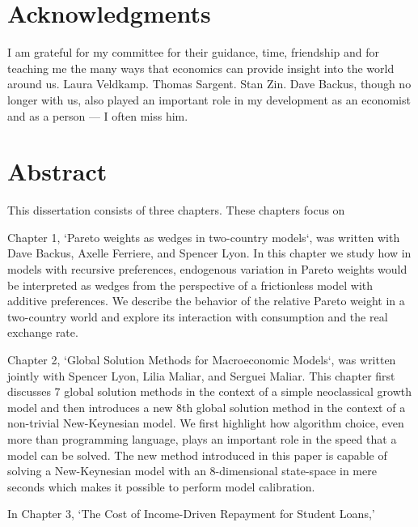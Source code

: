\documentclass[12pt,letterpaper,oneside,final]{memoir}
\begin{document}
\newpage

\chapter{Acknowledgments}

  I am grateful for my committee for their guidance, time, friendship and for teaching me the many
  ways that economics can provide insight into the world around us. Laura Veldkamp. Thomas Sargent.
  Stan Zin. Dave Backus, though no longer with us, also played an important role in my development
  as an economist and as a person --- I often miss him.

\newpage

\newpage

\chapter{Abstract}

  \DoubleSpacing

  This dissertation consists of three chapters. These chapters focus on

  Chapter 1, `Pareto weights as wedges in two-country models`, was written with Dave Backus, Axelle
  Ferriere, and Spencer Lyon. In this chapter we study how in models with recursive preferences,
  endogenous variation in Pareto weights would be interpreted as wedges from the perspective of a
  frictionless model with additive preferences. We describe the behavior of the relative Pareto
  weight in a two-country world and explore its interaction with consumption and the real exchange
  rate.

  Chapter 2, `Global Solution Methods for Macroeconomic Models`, was written jointly with Spencer
  Lyon, Lilia Maliar, and Serguei Maliar. This chapter first discusses 7 global solution methods in
  the context of a simple neoclassical growth model and then introduces a new 8th global solution
  method in the context of a non-trivial New-Keynesian model. We first highlight how algorithm
  choice, even more than programming language, plays an important role in the speed that a model can
  be solved. The new method introduced in this paper is capable of solving a New-Keynesian model
  with an 8-dimensional state-space in mere seconds which makes it possible to perform model
  calibration.

  In Chapter 3, `The Cost of Income-Driven Repayment for Student Loans,'
\end{document}
